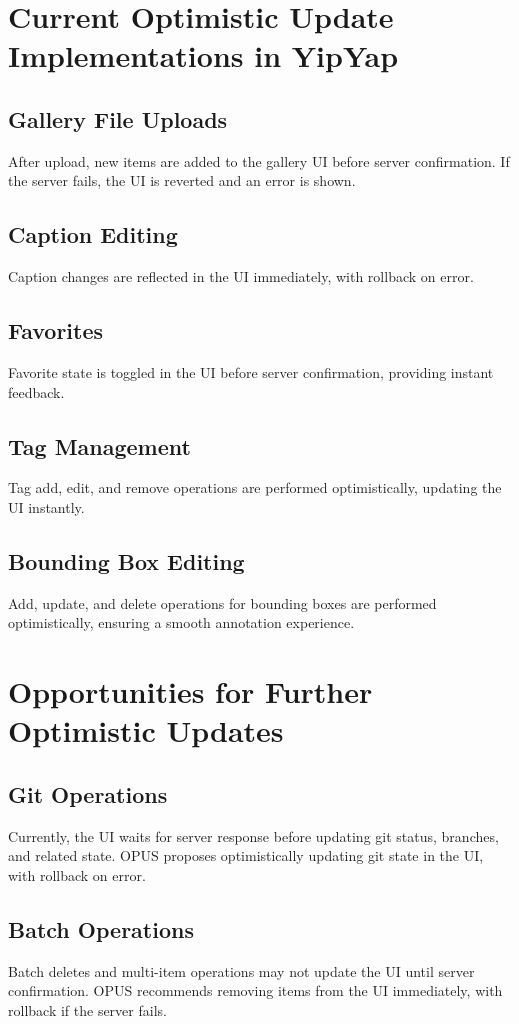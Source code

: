 \documentclass[10pt]{article}
\begin{document}
\section{Current Optimistic Update Implementations in YipYap}
\subsection{Gallery File Uploads}
After upload, new items are added to the gallery UI before server confirmation. If the server fails, the UI is reverted and an error is shown.

\subsection{Caption Editing}
Caption changes are reflected in the UI immediately, with rollback on error.

\subsection{Favorites}
Favorite state is toggled in the UI before server confirmation, providing instant feedback.

\subsection{Tag Management}
Tag add, edit, and remove operations are performed optimistically, updating the UI instantly.

\subsection{Bounding Box Editing}
Add, update, and delete operations for bounding boxes are performed optimistically, ensuring a smooth annotation experience.

\section{Opportunities for Further Optimistic Updates}
\subsection{Git Operations}
Currently, the UI waits for server response before updating git status, branches, and related state. OPUS proposes optimistically updating git state in the UI, with rollback on error.

\subsection{Batch Operations}
Batch deletes and multi-item operations may not update the UI until server confirmation. OPUS recommends removing items from the UI immediately, with rollback if the server fails.
\end{document}
